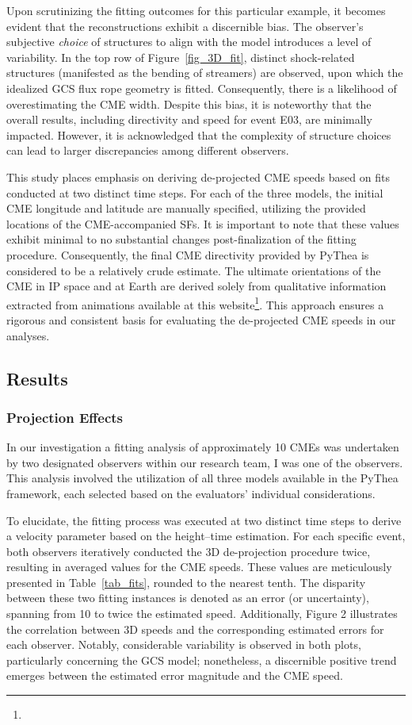 Upon scrutinizing the fitting outcomes for this particular example, it becomes evident that the reconstructions exhibit a discernible bias. The observer's subjective \textit{choice} of structures to align with the model introduces a level of variability. In the top row of Figure~\ref{fig_3D_fit}, distinct shock-related structures (manifested as the bending of streamers) are observed, upon which the idealized GCS flux rope geometry is fitted. Consequently, there is a likelihood of overestimating the CME width. Despite this bias, it is noteworthy that the overall results, including directivity and speed for event E03, are minimally impacted. However, it is acknowledged that the complexity of structure choices can lead to larger discrepancies among different observers.

This study places emphasis on deriving de-projected CME speeds based on fits conducted at two distinct time steps. For each of the three models, the initial CME longitude and latitude are manually specified, utilizing the provided locations of the CME-accompanied SFs. It is important to note that these values exhibit minimal to no substantial changes post-finalization of the fitting procedure. Consequently, the final CME directivity provided by PyThea is considered to be a relatively crude estimate. The ultimate orientations of the CME in IP space and at Earth are derived solely from qualitative information extracted from animations available at this website\footnote{\helioweatherurl}. This approach ensures a rigorous and consistent basis for evaluating the de-projected CME speeds in our analyses.

\subsection{Results}
\subsubsection{Projection Effects}
In our investigation a fitting analysis of approximately 10 CMEs was undertaken by two designated observers within our research team, I was one of the observers. This analysis involved the utilization of all three models available in the PyThea framework, each selected based on the evaluators' individual considerations.

To elucidate, the fitting process was executed at two distinct time steps to derive a velocity parameter based on the height–time estimation. For each specific event, both observers iteratively conducted the 3D de-projection procedure twice, resulting in averaged values for the CME speeds. These values are meticulously presented in Table~\ref{tab_fits}, rounded to the nearest tenth. The disparity between these two fitting instances is denoted as an error (or uncertainty), spanning from 10 \kms to twice the estimated speed. Additionally, Figure 2 illustrates the correlation between 3D speeds and the corresponding estimated errors for each observer. Notably, considerable variability is observed in both plots, particularly concerning the GCS model; nonetheless, a discernible positive trend emerges between the estimated error magnitude and the CME speed.

